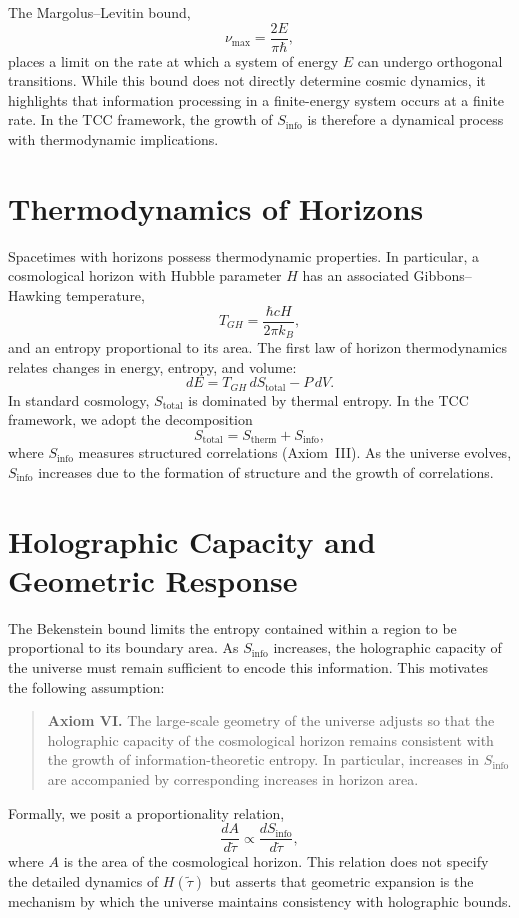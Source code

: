 \documentclass[12pt,openany]{book}
\theoremstyle{plain}
\theoremstyle{definition}
\theoremstyle{remark}
\begin{document}
The Margolus--Levitin bound,
\[
\nu_{\max} = \frac{2E}{\pi\hbar},
\]
places a limit on the rate at which a system of energy $E$ can undergo
orthogonal transitions. While this bound does not directly determine cosmic
dynamics, it highlights that information processing in a finite-energy system
occurs at a finite rate. In the TCC framework, the growth of
$S_{\mathrm{info}}$ is therefore a dynamical process with thermodynamic
implications.

\section{Thermodynamics of Horizons}

Spacetimes with horizons possess thermodynamic properties. In particular, a
cosmological horizon with Hubble parameter $H$ has an associated
Gibbons--Hawking temperature,
\[
T_{GH} = \frac{\hbar c H}{2\pi k_{B}},
\]
and an entropy proportional to its area. The first law of horizon
thermodynamics relates changes in energy, entropy, and volume:
\[
dE = T_{GH}\, dS_{\mathrm{total}} - P\, dV.
\]
In standard cosmology, $S_{\mathrm{total}}$ is dominated by thermal entropy.
In the TCC framework, we adopt the decomposition
\[
S_{\mathrm{total}} = S_{\mathrm{therm}} + S_{\mathrm{info}},
\]
where $S_{\mathrm{info}}$ measures structured correlations (Axiom~III). As the
universe evolves, $S_{\mathrm{info}}$ increases due to the formation of
structure and the growth of correlations.

\section{Holographic Capacity and Geometric Response}

The Bekenstein bound limits the entropy contained within a region to be
proportional to its boundary area. As $S_{\mathrm{info}}$ increases, the
holographic capacity of the universe must remain sufficient to encode this
information. This motivates the following assumption:

\begin{quote}
\textbf{Axiom VI.}  
The large-scale geometry of the universe adjusts so that the holographic
capacity of the cosmological horizon remains consistent with the growth of
information-theoretic entropy. In particular, increases in
$S_{\mathrm{info}}$ are accompanied by corresponding increases in horizon area.
\end{quote}

Formally, we posit a proportionality relation,
\[
\frac{dA}{d\tilde{\tau}}
  \propto \frac{dS_{\mathrm{info}}}{d\tilde{\tau}},
\]
where $A$ is the area of the cosmological horizon. This relation does not
specify the detailed dynamics of $H(\tilde{\tau})$ but asserts that geometric
expansion is the mechanism by which the universe maintains consistency with
holographic bounds.
\end{document}
